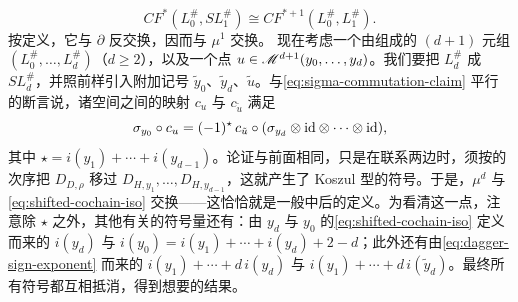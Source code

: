 \begin{equation}\label{eq:shifted-cochain-iso}
CF^*(L_0^{\#},SL_1^{\#})\cong CF^{*+1}(L_0^{\#},L_1^{\#}).
\end{equation}
按定义，它与 $\partial$ 反交换，因而与 $\mu^1$ 交换。
现在考虑一个由\trBrane{}组成的 $(d{+}1)$ 元组 $(L_0^{\#},\ldots,L_d^{\#})$（$d\ge 2$），以及一个\trIsolated{}点 $u\in\mathscr{M}^{d+1}(y_0,\ldots,y_d)$。我们要把 $L_d^{\#}$ \trSuspension{}成 $SL_d^{\#}$，并照前样引入附加记号 $\tilde{y}_0$、$\tilde{y}_d$、$\tilde{u}$。与\eqref{eq:sigma-commutation-claim} 平行的断言说，诸\trOrientation{}空间之间的\trMultilinear{}映射 $c_u$ 与 $c_{\tilde{u}}$ 满足
\begin{equation*}
\sigma_{y_0}\circ c_u=(-1)^{\star}\,c_{\tilde{u}}\circ(\sigma_{y_d}\otimes\mathrm{id}\otimes\cdots\otimes\mathrm{id}),
\end{equation*}
其中 $\star=i(y_1)+\cdots+i(y_{d-1})$。论证与前面相同，只是在联系两边时，须按\trComposition{}的次序把 $D_{D,\rho}$ 移过 $D_{H,y_1},\ldots,D_{H,y_{d-1}}$，这就产生了 Koszul 型的符号。于是，$\mu^d$ 与\eqref{eq:shifted-cochain-iso} 交换——这恰恰就是一般\trACategory{}中\trSuspension{}后\trObject{}的定义。为看清这一点，注意除 $\star$ 之外，其他有关的符号量还有：由 $y_d$ 与 $y_0$ 的\eqref{eq:shifted-cochain-iso} 定义而来的 $i(y_d)$ 与 $i(y_0)=i(y_1)+\cdots+i(y_d)+2-d$；此外还有由\eqref{eq:dagger-sign-exponent} 而来的 $i(y_1)+\cdots+d\,i(y_d)$ 与 $i(y_1)+\cdots+d\,i(\tilde{y}_d)$。最终所有符号都互相抵消，得到想要的结果。
